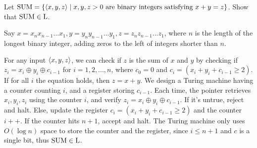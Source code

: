 \documentclass{homework}
\begin{document}
\begin{problem}
  Let $\mathrm{SUM} = \{ \langle x, y, z\rangle \mid x, y, z > 0 \text{ are binary
    integers satisfying } x+y=z \}$.
  Show that $\mathrm{SUM} \in \textup{L}$.
\end{problem}

\begin{solution}
  Say $x=x_nx_{n-1}...x_1, y=y_ny_{n-1}...y_1, z=z_nz_{n-1}...z_1$, where $n$ is the length of the longest binary integer, adding zeros to the left of integers shorter than $n$.

  For any input $\langle x, y, z\rangle$, we can check if $z$ is the sum of $x$ and $y$ by checking if $z_i = x_i\oplus y_i\oplus c_{i-1}$ for $i=1,2,...,n$, where $c_0 = 0$ and $c_i = (x_i+y_i+c_{i-1}\ge 2)$. If for all $i$ the equation holds, then $z = x + y$. We design a Turing machine having a counter counting $i$, and a register storing $c_{i-1}$. Each time, the pointer retrieves $x_i,y_i,z_i$ using the counter $i$, and verify $z_i = x_i\oplus y_i\oplus c_{i-1}$. If it's untrue, reject and halt. Else, update the register $c_i = (x_i+y_i+c_{i-1}\ge 2)$ and the counter $i++$. If the counter hits $n+1$, accept and halt. The Turing machine only uses $O(\log n)$ space to store the counter and the register, since $i\le n+1$ and $c$ is a single bit, thus $\mathrm{SUM} \in \textup{L}$.
\end{solution}

\begin{problem}
\end{problem}
\end{document}
